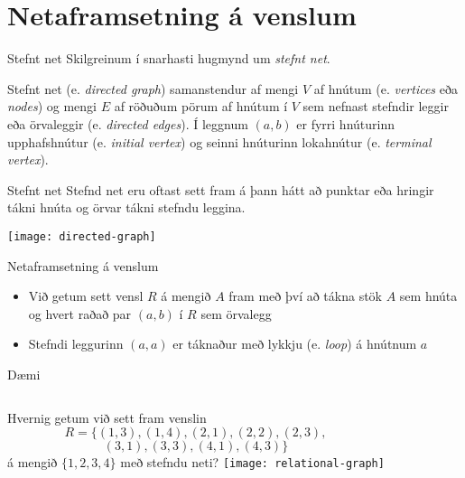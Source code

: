 \documentclass[handout]{beamer}
\begin{document}
\section{Netaframsetning á venslum}

\begin{frame}{Stefnt net}
Skilgreinum í snarhasti hugmynd um \emph{stefnt net}.
\begin{tcolorbox}[title=Stefnt net]
Stefnt net (e. \emph{directed graph}) samanstendur af mengi $V$ af hnútum (e. \emph{vertices} eða \emph{nodes}) og mengi $E$ af röðuðum pörum af hnútum í $V$ sem nefnast stefndir leggir eða örvaleggir (e. \emph{directed edges}). Í leggnum $(a, b)$ er fyrri hnúturinn upphafshnútur (e. \emph{initial vertex}) og seinni hnúturinn lokahnútur (e. \emph{terminal vertex}).
\end{tcolorbox}
\end{frame}

\begin{frame}{Stefnt net}
Stefnd net eru oftast sett fram á þann hátt að punktar eða hringir tákni hnúta og örvar tákni stefndu leggina.

\begin{center}
\texttt{[image: directed-graph]}
\end{center}

\end{frame}

\begin{frame}{Netaframsetning á venslum}
\begin{itemize}
 \item Við getum sett vensl $R$ á mengið $A$ fram með því að tákna stök $A$ sem hnúta og hvert raðað par $(a, b)$ í $R$ sem örvalegg
 \item Stefndi leggurinn $(a, a)$ er táknaður með lykkju (e. \emph{loop}) á hnútnum $a$
\end{itemize}
\end{frame}

\begin{frame}{Dæmi}
\begin{columns}
Hvernig getum við sett fram venslin
\[
 R = \{(1, 3), (1, 4), (2, 1), (2, 2), (2, 3),
\]
\[
 (3, 1), (3, 3), (4, 1), (4, 3)\}
\]
á mengið $\{1, 2, 3, 4\}$ með stefndu neti? \pause
{}
\texttt{[image: relational-graph]}
\end{columns}
\end{frame}
\end{document}
